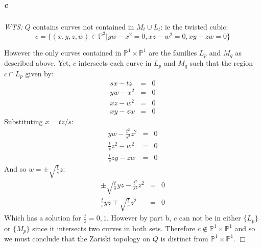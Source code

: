 \documentclass{article}
\begin{document}
\subparagraph{c}

\emph{WTS:} $Q$ contains curves not contained in $M_t \cup L_t$: ie the twisted cubic:
\[ c = \{ (x,y,z,w) \in \mathbb{P}^3 | yw - x^2 = 0, xz - w^2 = 0, xy - zw = 0 \} \]

However the only curves contained in $\mathbb{P}^1 \times \mathbb{P}^1$ are the families $L_p$ and $M_q$ as described above.  Yet, $c$ intersects each curve in $L_p$ and $M_q$ such that the region $c \cap L_p$ given by:
\begin{eqnarray*}
sx - tz & = & 0 \\
yw - x^2 & = & 0 \\
xz - w^2 & = & 0 \\
xy - zw & = & 0
\end{eqnarray*}
Substituting $x = tz / s$:
\begin{eqnarray*}
yw - \frac{t^2}{s^2}z^2 & = & 0\\
\frac{t}{s}z^2 - w^2 & = & 0 \\
\frac{t}{s}zy - zw & = & 0
\end{eqnarray*}
And so $w = \pm \sqrt{\frac{t}{s}} z$:
\begin{eqnarray*}
\pm \sqrt{\frac{t}{s}} yz  - \frac{t^2}{s^2} z^2 & = & 0 \\
\frac{t}{s}y z \mp \sqrt{\frac{t}{s}} z^2 & = & 0 
\end{eqnarray*}
Which has a solution for $\frac{t}{s} = 0, 1$.  However by part b, $c$ can not be in either $\{ L_p \}$ or $\{ M_p \}$ since it intersects two curves in both sets.  Therefore $c \not \in \mathbb{P}^1 \times \mathbb{P}^1$ and so we must conclude that the Zariski topology on $Q$ is distinct from $\mathbb{P}^1 \times \mathbb{P}^1$. $\Box$
\end{document}
